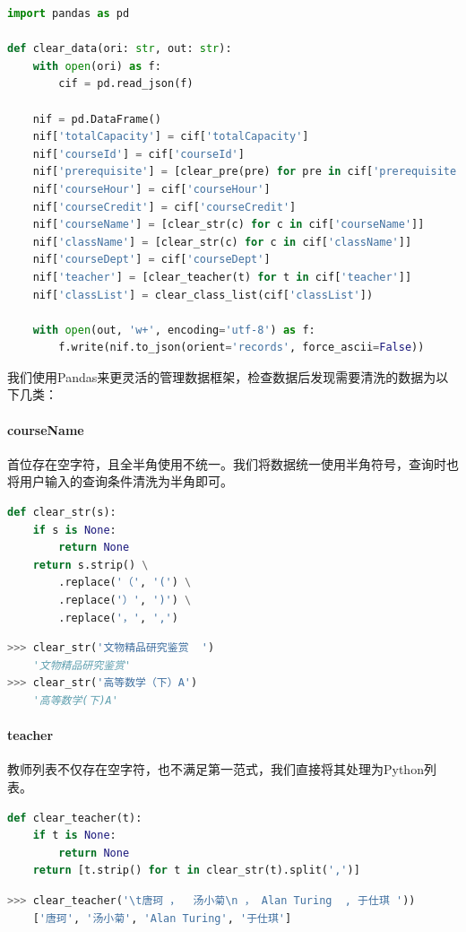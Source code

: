 \begin{lstlisting}[language=python]
import pandas as pd

def clear_data(ori: str, out: str):
    with open(ori) as f:
        cif = pd.read_json(f)

    nif = pd.DataFrame()
    nif['totalCapacity'] = cif['totalCapacity']
    nif['courseId'] = cif['courseId']
    nif['prerequisite'] = [clear_pre(pre) for pre in cif['prerequisite']]
    nif['courseHour'] = cif['courseHour']
    nif['courseCredit'] = cif['courseCredit']
    nif['courseName'] = [clear_str(c) for c in cif['courseName']]
    nif['className'] = [clear_str(c) for c in cif['className']]
    nif['courseDept'] = cif['courseDept']
    nif['teacher'] = [clear_teacher(t) for t in cif['teacher']]
    nif['classList'] = clear_class_list(cif['classList'])

    with open(out, 'w+', encoding='utf-8') as f:
        f.write(nif.to_json(orient='records', force_ascii=False))
\end{lstlisting}

\vspace{-3em}\par
我们使用Pandas来更灵活的管理数据框架，检查数据后发现需要清洗的数据为以下几类：
\paragraph{courseName}首位存在空字符，且全半角使用不统一。我们将数据统一使用半角符号，查询时也将用户输入的查询条件清洗为半角即可。
\begin{lstlisting}[language=python]
def clear_str(s):
    if s is None:
        return None
    return s.strip() \
        .replace('（', '(') \
        .replace('）', ')') \
        .replace('，', ',')
\end{lstlisting}
\vspace{-3em}
\begin{lstlisting}[language=python]
>>> clear_str('文物精品研究鉴赏  ')
    '文物精品研究鉴赏'
>>> clear_str('高等数学（下）A')
    '高等数学(下)A'
\end{lstlisting}
\vspace{-3em}

\paragraph{teacher}教师列表不仅存在空字符，也不满足第一范式，我们直接将其处理为Python列表。
\begin{lstlisting}[language=python]
def clear_teacher(t):
    if t is None:
        return None
    return [t.strip() for t in clear_str(t).split(',')]
\end{lstlisting}
\vspace{-3em}
\begin{lstlisting}[language=python]
>>> clear_teacher('\t唐珂 ，  汤小菊\n ， Alan Turing  , 于仕琪 '))
	['唐珂', '汤小菊', 'Alan Turing', '于仕琪']
\end{lstlisting}
\vspace{-3em}


